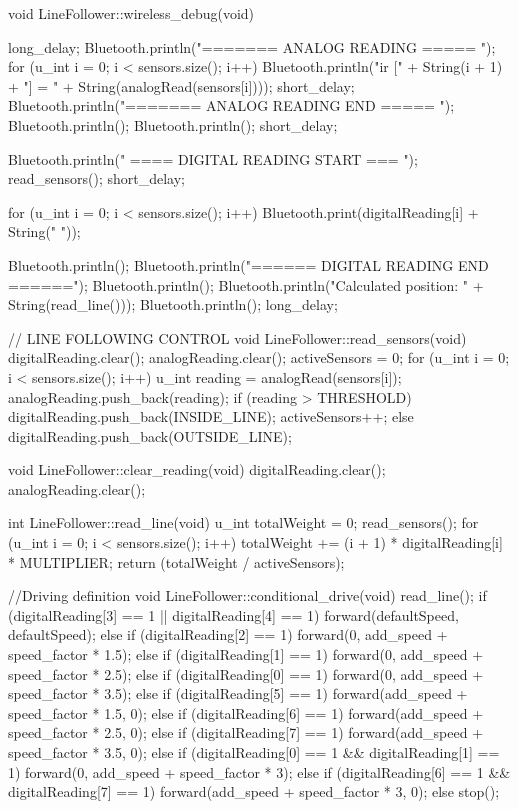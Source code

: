 \documentclass[14pt,a4paper]{extarticle}
\begin{document}
\begin{spverbatim}
void LineFollower::wireless_debug(void)
{
  long_delay;
  Bluetooth.println("======= ANALOG READING ===== ");
  for (u_int i = 0; i < sensors.size(); i++){
  Bluetooth.println("ir [" + String(i + 1) + "] = " + 
   String(analogRead(sensors[i]))); 
    short_delay;
  }
  Bluetooth.println("======= ANALOG READING END ===== ");
  Bluetooth.println();
  Bluetooth.println();
  short_delay;

  Bluetooth.println(" ==== DIGITAL READING START === ");
  read_sensors();
  short_delay;
  
  for (u_int i = 0; i < sensors.size(); i++)
  Bluetooth.print(digitalReading[i] + String(" ")); 
    
  Bluetooth.println();
  Bluetooth.println("====== DIGITAL READING END ======");
  Bluetooth.println();
  Bluetooth.println("Calculated position: " + String(read_line()));
  Bluetooth.println();
  long_delay;
}

// LINE FOLLOWING CONTROL
void LineFollower::read_sensors(void)
{
  digitalReading.clear();
  analogReading.clear();
  activeSensors = 0;
  for (u_int i = 0; i < sensors.size(); i++) {
    u_int reading = analogRead(sensors[i]);
    analogReading.push_back(reading);
    if (reading > THRESHOLD){
      digitalReading.push_back(INSIDE_LINE);
      activeSensors++;
    }
    else
      digitalReading.push_back(OUTSIDE_LINE);
  }
}

void LineFollower::clear_reading(void)
{
  digitalReading.clear();
  analogReading.clear();
}

int LineFollower::read_line(void)
{
  u_int totalWeight = 0;
  read_sensors();
  for (u_int i = 0; i < sensors.size(); i++)
  {
    totalWeight += (i + 1) * digitalReading[i] * MULTIPLIER;
  }
  return (totalWeight / activeSensors);
}

//Driving definition
void LineFollower::conditional_drive(void)
{
  read_line();
  if (digitalReading[3] == 1 || digitalReading[4] == 1)
    forward(defaultSpeed, defaultSpeed);
  else if (digitalReading[2] == 1)
    forward(0, add_speed + speed_factor * 1.5);
  else if (digitalReading[1] == 1)
    forward(0, add_speed + speed_factor * 2.5);
  else if (digitalReading[0] == 1)
    forward(0, add_speed + speed_factor * 3.5);
  else if (digitalReading[5] == 1)
    forward(add_speed + speed_factor * 1.5, 0);
  else if (digitalReading[6] == 1)
    forward(add_speed + speed_factor * 2.5, 0);
  else if (digitalReading[7] == 1)
    forward(add_speed + speed_factor * 3.5, 0);
  else if (digitalReading[0] == 1 && digitalReading[1] == 1)
    forward(0, add_speed + speed_factor * 3);
  else if (digitalReading[6] == 1 && digitalReading[7] == 1)
    forward(add_speed + speed_factor * 3, 0);
  else stop();
}


\end{spverbatim}
\end{document}
